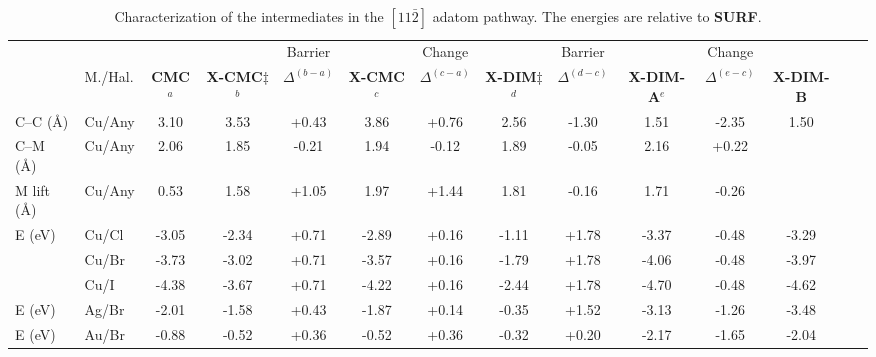 \documentclass[aps,prl,reprint,amsmath,amssymb,floatfix,notitlepage]{revtex4-1}
\begin{document}
\begin{table}
\centering
\caption{Characterization of the intermediates in the $[11\bar{2}]$ adatom pathway. The energies are relative to \textbf{SURF}. 
}
\label{table:adatom-longitude}
\begin{tabular}{ llcccccccccccc  }
 \hline
 \hline
  & & & & Barrier & & Change & & Barrier & &Change&\\
  & M./Hal. & \textbf{CMC}$^{a}$ & \textbf{X-CMC$\ddagger$}$^{b}$ & $\Delta^{(b-a)}$ & \textbf{X-CMC}$^{c}$ &$\Delta^{(c-a)}$ & \textbf{X-DIM$\ddagger$}$^{d}$ & $\Delta^{(d-c)}$ & \textbf{X-DIM-A}$^{e}$ &$\Delta^{(e-c)}$ & \textbf{X-DIM-B}  \\ 
 \hline
 \hline 
 {C--C (\si{\angstrom})} & Cu/Any & {3.10} & {3.53} & {+0.43} & {3.86} &{+0.76} & {2.56} & {-1.30} & {1.51} &{-2.35} &{1.50}\\ 
 \hline
 {C--M (\si{\angstrom}) } & Cu/Any & {2.06} & {1.85} & {-0.21} & {1.94} &{-0.12} & {1.89} & {-0.05} & {2.16} &{+0.22} & \\ 
 \hline
 {M lift (\si{\angstrom}) } & Cu/Any & {0.53} & {1.58} & {+1.05} & {1.97} &{+1.44} & {1.81} & {-0.16} & {1.71} &{-0.26} & \\ 
 \hline
 \multirow{3}{*}{E (\si{\electronvolt}) } & Cu/Cl & -3.05 &-2.34 & +0.71 &-2.89 &+0.16 &-1.11 & +1.78 & -3.37&-0.48&-3.29\\ 
 & Cu/Br &-3.73 &-3.02 &+0.71 & -3.57 &+0.16 &-1.79 & +1.78 & -4.06 & -0.48&-3.97 \\ 
 & Cu/I  & -4.38 & -3.67 & +0.71 & -4.22 &+0.16 &-2.44 & +1.78 & -4.70 & -0.48&-4.62\\ 
 \hline
 E (\si{\electronvolt}) & Ag/Br &-2.01 &-1.58 &+0.43 &-1.87 &+0.14 &-0.35 &+1.52 &-3.13 &-1.26 &-3.48 \\ 
 E (\si{\electronvolt}) & Au/Br &-0.88 &-0.52 &+0.36 &-0.52 &+0.36 &-0.32 &+0.20 &-2.17 &-1.65 &-2.04 \\
  \hline
 \hline
\end{tabular}
\end{table}
\end{document}
